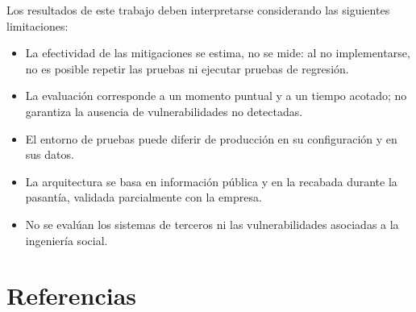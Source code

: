 \documentclass[12pt,letterpaper]{report}
\begin{document}
Los resultados de este trabajo deben interpretarse considerando las siguientes
limitaciones:

\begin{itemize}[leftmargin=1.25cm]
    \item La efectividad de las mitigaciones se estima, no se mide: al no
    implementarse, no es posible repetir las pruebas ni ejecutar pruebas de
    regresión.
    \item La evaluación corresponde a un momento puntual y a un tiempo
    acotado; no garantiza la ausencia de vulnerabilidades no detectadas.
    \item El entorno de pruebas puede diferir de producción en su configuración
    y en sus datos.
    \item La arquitectura se basa en información pública y en la recabada
    durante la pasantía, validada parcialmente con la empresa.
    \item No se evalúan los sistemas de terceros ni las vulnerabilidades
    asociadas a la ingeniería social.
\end{itemize}

\newpage


\chapter*{Referencias}

\vspace{0.5cm}


\printbibliography[heading=none]

\newpage
\end{document}
